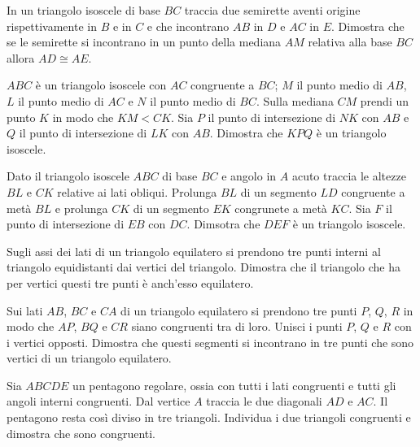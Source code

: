 \begin{multicols}{2}
\begin{esercizio}
\label{ese:2.90}
In un triangolo isoscele di base \(BC\) traccia due semirette aventi 
origine rispettivamente in \(B\) e in \(C\) e che incontrano \(AB\) in \(D\) 
e \(AC\) in \(E\). Dimostra che se le semirette si incontrano in un punto 
della mediana \(AM\) relativa alla base \(BC\) allora \(AD\cong AE\).
\end{esercizio}

\begin{esercizio}
\label{ese:2.91}
\(ABC\) è un triangolo isoscele con \(AC\) congruente a \(BC\); \(M\) il 
punto medio di \(AB\), \(L\) il punto medio di \(AC\) e \(N\) il punto medio 
di \(BC\). Sulla mediana \(CM\) prendi un punto \(K\) in modo che \(KM<CK\). 
Sia \(P\) il punto di intersezione di \(NK\) con \(AB\) e \(Q\) il punto di 
intersezione di \(LK\) con \(AB\). Dimostra che \(KPQ\) è un triangolo 
isoscele.
\end{esercizio}

\begin{esercizio}
\label{ese:2.92}
Dato il triangolo isoscele \(ABC\) di base \(BC\) e angolo in \(A\) acuto 
traccia le altezze \(BL\) e \(CK\) relative ai lati obliqui. Prolunga 
\(BL\) di un segmento \(LD\) congruente a metà \(BL\) e prolunga \(CK\) di un 
segmento \(EK\) congrunete a metà \(KC\). Sia \(F\) il punto di 
intersezione di \(EB\) con \(DC\). Dimsotra che \(DEF\) è un triangolo 
isoscele.
\end{esercizio}

\begin{esercizio}
\label{ese:2.93}
Sugli assi dei lati di un triangolo equilatero si prendono tre punti 
interni al triangolo equidistanti dai vertici del triangolo. Dimostra 
che il triangolo che ha per vertici questi tre punti è anch'esso 
equilatero.
\end{esercizio}

\begin{esercizio}
\label{ese:2.94}
Sui lati \(AB\), \(BC\) e \(CA\) di un triangolo equilatero si prendono tre 
punti \(P\), \(Q\), \(R\) in modo che \(AP\), \(BQ\) e \(CR\) siano congruenti 
tra di loro. Unisci i punti \(P\), \(Q\) e \(R\) con i vertici opposti. 
Dimostra che questi segmenti si incontrano in tre punti che sono 
vertici di un triangolo equilatero.
\end{esercizio}

\begin{esercizio}
\label{ese:2.95}
Sia \(ABCDE\) un pentagono regolare, ossia con tutti i lati congruenti 
e tutti gli angoli interni congruenti. Dal vertice \(A\) traccia le due 
diagonali \(AD\) e \(AC\). Il pentagono resta così diviso in tre 
triangoli. Individua i due triangoli congruenti e dimostra che sono 
congruenti.
\end{esercizio}


\end{multicols}
